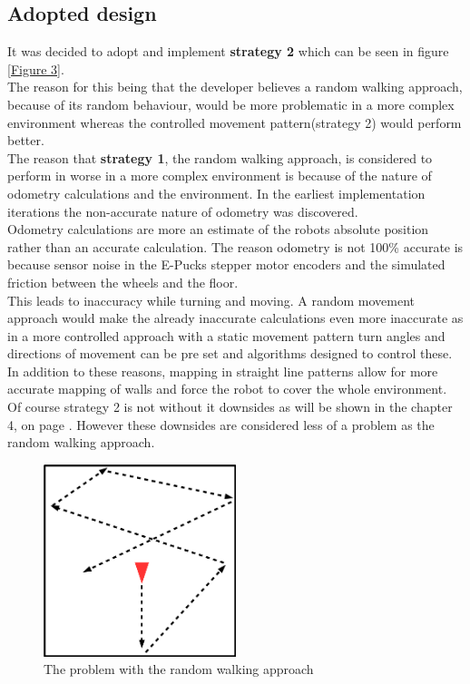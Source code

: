 \subsection{Adopted design}
It was decided to adopt and implement \textbf{strategy 2} which can be seen in figure \ref{Figure 3}.\\
The reason for this being that the developer believes a random walking approach, because of its random behaviour, would be more problematic in a more complex environment whereas the controlled movement pattern(strategy 2) would perform better.\\
The reason that \textbf{strategy 1}, the random walking approach, is considered to perform in worse in a more complex environment is because of the nature of odometry calculations and the environment. In the earliest implementation iterations the non-accurate nature of odometry was discovered. \\
Odometry calculations are more an estimate of the robots absolute position rather than an accurate calculation. The reason odometry is not 100\% accurate is because sensor noise in the E-Pucks stepper motor encoders and the simulated friction between the wheels and the floor. \\[3ex]

This leads to inaccuracy while turning and moving. A random movement approach would make the already inaccurate calculations even more inaccurate as in a more controlled approach with a static movement pattern turn angles and directions of movement can be pre set and algorithms designed to control these. \\
In addition to these reasons, mapping in straight line patterns allow for more accurate mapping of walls and force the robot to cover the whole environment.\\
Of course strategy 2 is not without it downsides as will be shown in the chapter 4, on page \pageref{Testing}. However these downsides are considered less of a problem as the random walking approach.

\begin{figure}[h]
\centering
\includegraphics[width=0.5\textwidth]{../../figures/random_walking.png} 
\caption{The problem with the random walking approach}
\label{random_walking}
\end{figure}

